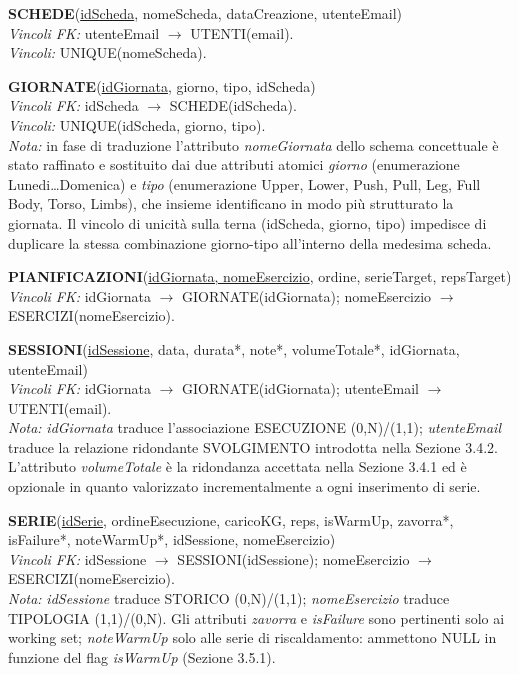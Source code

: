 \documentclass[12pt]{report}
\begin{document}
\vspace{0.3cm}
\noindent
\textbf{SCHEDE}(\underline{idScheda}, nomeScheda, dataCreazione,
utenteEmail) \\
\textit{Vincoli FK:} utenteEmail $\rightarrow$ UTENTI(email). \\
\textit{Vincoli:} UNIQUE(nomeScheda).

\vspace{0.3cm}
\noindent
\textbf{GIORNATE}(\underline{idGiornata}, giorno, tipo, idScheda) \\
\textit{Vincoli FK:} idScheda $\rightarrow$ SCHEDE(idScheda). \\
\textit{Vincoli:} UNIQUE(idScheda, giorno, tipo). \\
\textit{Nota:} in fase di traduzione l'attributo \textit{nomeGiornata} dello schema 
concettuale è stato raffinato e sostituito dai due attributi atomici \textit{giorno}
(enumerazione Lunedi…Domenica) e \textit{tipo} (enumerazione Upper, Lower, Push, Pull, Leg, Full Body, Torso, Limbs), 
che insieme identificano in modo più strutturato la giornata. Il vincolo di unicità sulla terna 
(idScheda, giorno, tipo) impedisce di duplicare la stessa combinazione giorno-tipo all'interno della medesima scheda.

\vspace{0.3cm}
\noindent
\textbf{PIANIFICAZIONI}(\underline{idGiornata, nomeEsercizio}, ordine,
serieTarget, repsTarget) \\
\textit{Vincoli FK:} idGiornata $\rightarrow$ GIORNATE(idGiornata);
nomeEsercizio $\rightarrow$ ESERCIZI(nomeEsercizio).

\vspace{0.3cm}
\noindent
\textbf{SESSIONI}(\underline{idSessione}, data, durata*, note*,
volumeTotale*, idGiornata, utenteEmail) \\
\textit{Vincoli FK:} idGiornata $\rightarrow$ GIORNATE(idGiornata);
utenteEmail $\rightarrow$ UTENTI(email). \\
\textit{Nota:} \textit{idGiornata} traduce l'associazione ESECUZIONE
(0,N)/(1,1); \textit{utenteEmail} traduce la relazione ridondante
SVOLGIMENTO introdotta nella Sezione 3.4.2. L'attributo
\textit{volumeTotale} è la ridondanza accettata nella Sezione 3.4.1
ed è opzionale in quanto valorizzato incrementalmente a ogni
inserimento di serie.

\vspace{0.3cm}
\noindent
\textbf{SERIE}(\underline{idSerie}, ordineEsecuzione, caricoKG, reps,
isWarmUp, zavorra*, isFailure*, noteWarmUp*, idSessione, nomeEsercizio) \\
\textit{Vincoli FK:} idSessione $\rightarrow$ SESSIONI(idSessione);
nomeEsercizio $\rightarrow$ ESERCIZI(nomeEsercizio). \\
\textit{Nota:} \textit{idSessione} traduce STORICO (0,N)/(1,1);
\textit{nomeEsercizio} traduce TIPOLOGIA (1,1)/(0,N). Gli attributi
\textit{zavorra} e \textit{isFailure} sono pertinenti solo ai working
set; \textit{noteWarmUp} solo alle serie di riscaldamento: ammettono
NULL in funzione del flag \textit{isWarmUp} (Sezione 3.5.1).
\end{document}
